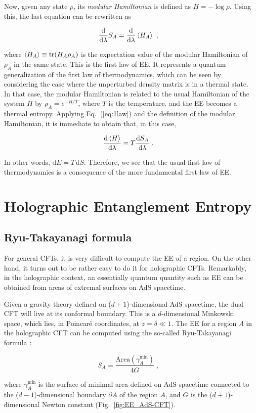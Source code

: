 \documentclass[twocolumn]{revtex4}
\providecommand{\eq}[2]{
    \begin{equation}
        #2
    \label{eq:#1}
    \end{equation}
}
\DeclareMathOperator{\tr}{tr}
\begin{document}
Now, given any state $\rho$, its \emph{modular Hamiltonian} is defined as $H = - \log \rho$. %
Using this, the last equation can be rewritten  as
\eq{1law}{
    \frac{\mathrm{d}}{\mathrm{d} \lambda} S_A = \frac{\mathrm{d}}{\mathrm{d} \lambda} \braket{H_A} \ ,
}
where $\braket{H_A} \equiv \tr (H_A \rho_A)$ is the expectation value of the modular Hamiltonian of $\rho_A$ in the same state. This is the first law of EE. It %
represents a quantum generalization of the first law of thermodynamics, which can be seen by considering the case where the unperturbed density matrix is in a  thermal state. In that case, the modular Hamiltonian is related to the usual Hamiltonian of the system $H$ by
$
    \rho_A =  e^{-H/T} 
$, where $T$ is the temperature,
and the EE becomes a thermal entropy. Applying Eq.~(\ref{eq:1law}) and the definition of the modular Hamiltonian, it is immediate to obtain that, in this case,
\eq{1law_thermo}{
    \frac{\mathrm{d}\braket{H}}{\mathrm{d} \lambda}  =  T \frac{\mathrm{d}S_A}{\mathrm{d} \lambda}  \ .
}
In other words, $\mathrm{d} E = T \, \mathrm{d} S$. Therefore, we see that the usual first law of thermodynamics is a consequence of  the more fundamental first law of EE.


\section{Holographic Entanglement Entropy} \label{s:EE_Holo}


\subsection{Ryu-Takayanagi formula} \label{ss:R-T}

For general CFTs, it is very difficult to compute the EE of a region. On the other hand, it turns out to be rather easy to do it for holographic CFTs. Remarkably, in the holographic context, an essentially quantum quantity such as EE can be obtained from areas of extremal surfaces on AdS spacetime.

Given a gravity theory defined on ($d+1$)-dimensional AdS spacetime, the dual CFT will live at its conformal boundary. This is a $d$-dimensional Minkowski space, which lies, in Poincar\'e coordinates, at 
$z=\delta \ll 1$. The EE for a region $A$ in the holographic CFT can be computed using the so-called Ryu-Takayanagi formula \cite{ryu_holographic_2008}:
\eq{EE_RT}{
    S_A = \frac{ \text{Area}(\gamma_A^\text{min}) }{ 4 G } \ ,
}
where $\gamma_A^\text{min}$ is the surface of minimal area defined on AdS spacetime connected to the ($d-1$)-dimensional boundary $\partial A$ of the region $A$, and $G$ is the ($d+1$)-dimensional Newton constant (Fig.~\ref{fig:EE_AdS-CFT}).
\end{document}
